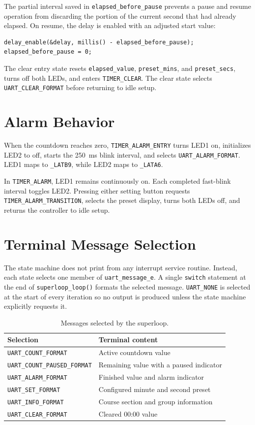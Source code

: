 \documentclass[11pt]{article}
\newcommand{\state}[1]{\texttt{#1}}
\newcommand{\code}[1]{\texttt{#1}}
\begin{document}
The partial interval saved in \code{elapsed\_before\_pause} prevents a pause and resume operation from discarding the portion of the current second that had already elapsed. On resume, the delay is enabled with an adjusted start value:

\begin{verbatim}
delay_enable(&delay, millis() - elapsed_before_pause);
elapsed_before_pause = 0;
\end{verbatim}

The clear entry state resets \code{elapsed\_value}, \code{preset\_mins}, and \code{preset\_secs}, turns off both LEDs, and enters \state{TIMER\_CLEAR}. The clear state selects \code{UART\_CLEAR\_FORMAT} before returning to idle setup.

\section{Alarm Behavior}

When the countdown reaches zero, \state{TIMER\_ALARM\_ENTRY} turns LED1 on, initializes LED2 to off, starts the 250~ms blink interval, and selects \code{UART\_ALARM\_FORMAT}. LED1 maps to \code{\_LATB9}, while LED2 maps to \code{\_LATA6}.

In \state{TIMER\_ALARM}, LED1 remains continuously on. Each completed fast-blink interval toggles LED2. Pressing either setting button requests \state{TIMER\_ALARM\_TRANSITION}, selects the preset display, turns both LEDs off, and returns the controller to idle setup.

\section{Terminal Message Selection}

The state machine does not print from any interrupt service routine. Instead, each state selects one member of \code{uart\_message\_e}. A single \code{switch} statement at the end of \code{superloop\_loop()} formats the selected message. \code{UART\_NONE} is selected at the start of every iteration so no output is produced unless the state machine explicitly requests it.

\begin{table}[htbp]
\centering
\begin{tabular}{ll}
\hline
Selection & Terminal content \\
\hline
\code{UART\_COUNT\_FORMAT} & Active countdown value \\
\code{UART\_COUNT\_PAUSED\_FORMAT} & Remaining value with a paused indicator \\
\code{UART\_ALARM\_FORMAT} & Finished value and alarm indicator \\
\code{UART\_SET\_FORMAT} & Configured minute and second preset \\
\code{UART\_INFO\_FORMAT} & Course section and group information \\
\code{UART\_CLEAR\_FORMAT} & Cleared 00:00 value \\
\hline
\end{tabular}
\caption{Messages selected by the superloop.}
\label{tab:messages}
\end{table}
\end{document}
